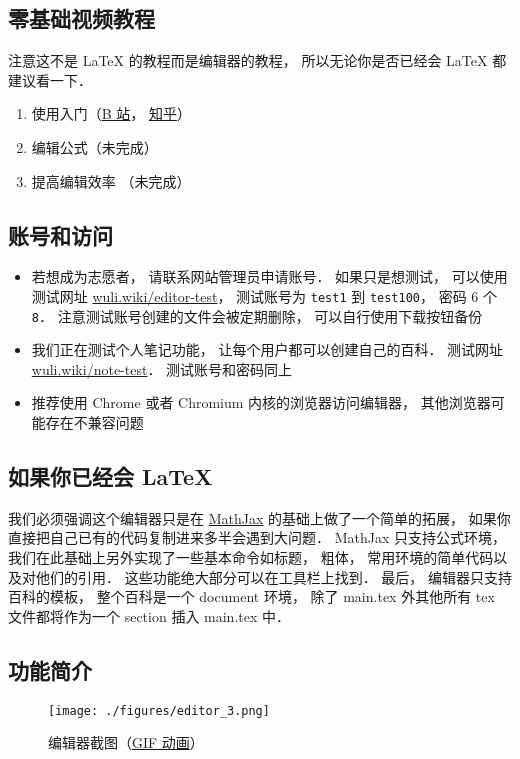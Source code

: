 
\subsection{零基础视频教程}
注意这不是 LaTeX 的教程而是编辑器的教程， 所以无论你是否已经会 LaTeX 都建议看一下．
\begin{enumerate}
\item 使用入门（\href{https://www.bilibili.com/video/av87698355/}{B 站}， \href{https://zhuanlan.zhihu.com/p/105869878}{知乎}）
\item 编辑公式（未完成）
\item 提高编辑效率 （未完成）
\end{enumerate}

\subsection{账号和访问}
\begin{itemize}
\item 若想成为志愿者， 请联系网站管理员申请账号． 如果只是想测试， 可以使用测试网址 \href{http://wuli.wiki/editor-test}{wuli.wiki/editor-test}， 测试账号为 \verb|test1| 到 \verb|test100|， 密码 6 个 \verb|8|． 注意测试账号创建的文件会被定期删除， 可以自行使用下载按钮备份
\item 我们正在测试个人笔记功能， 让每个用户都可以创建自己的百科． 测试网址 \href{http://wuli.wiki/note-test}{wuli.wiki/note-test}． 测试账号和密码同上
\item 推荐使用 Chrome 或者 Chromium 内核的浏览器访问编辑器， 其他浏览器可能存在不兼容问题
\end{itemize}

\subsection{如果你已经会 LaTeX}
我们必须强调这个编辑器只是在 \href{https://www.mathjax.org/}{MathJax} 的基础上做了一个简单的拓展， 如果你直接把自己已有的代码复制进来多半会遇到大问题． MathJax 只支持公式环境， 我们在此基础上另外实现了一些基本命令如标题， 粗体， 常用环境的简单代码以及对他们的引用． 这些功能绝大部分可以在工具栏上找到． 最后， 编辑器只支持百科的模板， 整个百科是一个 document 环境， 除了 main.tex 外其他所有 tex 文件都将作为一个 section 插入 main.tex 中．

\subsection{功能简介}
\begin{figure}[ht]
\centering
\texttt{[image: ./figures/editor\_3.png]}
\caption{编辑器截图（\href{http://wuli.wiki/apps/editor.gif}{GIF 动画}）} \label{editor_fig3}
\end{figure}

